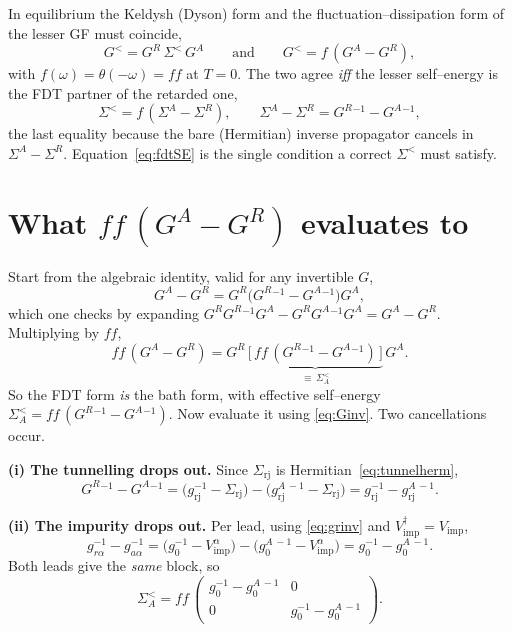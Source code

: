 \documentclass[11pt]{article}
\newcommand{\GR}{G^{R}}
\newcommand{\GA}{G^{A}}
\newcommand{\gz}{g_{0}}
\newcommand{\Vimp}{V_{\mathrm{imp}}}
\newcommand{\Sless}{\Sigma^{<}}
\newcommand{\dg}{^{\dagger}}
\begin{document}
In equilibrium the Keldysh (Dyson) form and the fluctuation--dissipation form of the
lesser GF must coincide,
\begin{equation}
  G^{<}=\GR\,\Sless\,\GA
  \qquad\text{and}\qquad
  G^{<}=f\,(\GA-\GR),
  \label{eq:two}
\end{equation}
with $f(\omega)=\theta(-\omega)=ff$ at $T=0$. The two agree \emph{iff} the lesser
self--energy is the FDT partner of the retarded one,
\begin{equation}
  \Sless=f\,(\Sigma^{A}-\Sigma^{R}),
  \qquad
  \Sigma^{A}-\Sigma^{R}=\GR{}^{-1}-\GA{}^{-1},
  \label{eq:fdtSE}
\end{equation}
the last equality because the bare (Hermitian) inverse propagator cancels in
$\Sigma^{A}-\Sigma^{R}$. Equation~\eqref{eq:fdtSE} is the single condition a correct
$\Sless$ must satisfy.

\section{What $ff\,(\GA-\GR)$ evaluates to}

Start from the algebraic identity, valid for any invertible $G$,
\begin{equation}
  \GA-\GR=\GR\bigl(\GR{}^{-1}-\GA{}^{-1}\bigr)\GA ,
  \label{eq:keldysh}
\end{equation}
which one checks by expanding
$\GR\GR{}^{-1}\GA-\GR\GA{}^{-1}\GA=\GA-\GR$. Multiplying by $ff$,
\begin{equation}
  ff\,(\GA-\GR)=\GR\,\underbrace{\bigl[\,ff\,(\GR{}^{-1}-\GA{}^{-1})\,\bigr]}_{\displaystyle \equiv\,\Sless_{A}}\,\GA .
  \label{eq:tobath}
\end{equation}
So the FDT form \emph{is} the bath form, with effective self--energy
$\Sless_{A}=ff\,(\GR{}^{-1}-\GA{}^{-1})$. Now evaluate it using \eqref{eq:Ginv}.
Two cancellations occur.

\medskip
\noindent\textbf{(i) The tunnelling drops out.} Since $\Sigma_{\mathrm{rj}}$ is
Hermitian~\eqref{eq:tunnelherm},
\begin{equation}
  \GR{}^{-1}-\GA{}^{-1}
  =\bigl(g_{\mathrm{rj}}^{-1}-\Sigma_{\mathrm{rj}}\bigr)
  -\bigl(g_{\mathrm{rj}}^{A\,-1}-\Sigma_{\mathrm{rj}}\bigr)
  =g_{\mathrm{rj}}^{-1}-g_{\mathrm{rj}}^{A\,-1}.
\end{equation}

\noindent\textbf{(ii) The impurity drops out.} Per lead, using \eqref{eq:grinv} and
$\Vimp\dg=\Vimp$,
\begin{equation}
  g_{r\alpha}^{-1}-g_{a\alpha}^{-1}
  =\bigl(\gz^{-1}-\Vimp^{\alpha}\bigr)-\bigl(\gz^{A\,-1}-\Vimp^{\alpha}\bigr)
  =\gz^{-1}-\gz^{A\,-1}.
\end{equation}
Both leads give the \emph{same} block, so
\begin{equation}
  \Sless_{A}=ff\,
  \begin{pmatrix}\gz^{-1}-\gz^{A\,-1} & 0\\[2pt] 0 & \gz^{-1}-\gz^{A\,-1}\end{pmatrix}.
  \label{eq:SAmid}
\end{equation}
\end{document}
